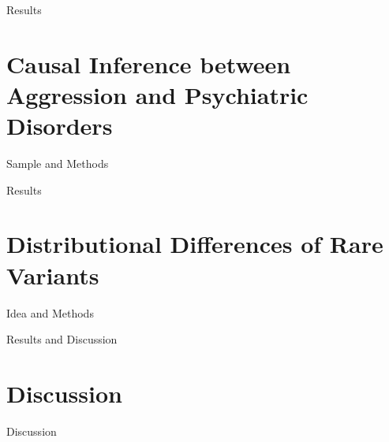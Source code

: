 \documentclass{beamer}
\begin{document}
  \begin{frame}[t]{Results}
    
  \end{frame}

  \section{Causal Inference between Aggression and Psychiatric Disorders}

  \begin{frame}[t]{Sample and Methods}
    
  \end{frame}

  \begin{frame}[t]{Results}
    
  \end{frame}

  \section{Distributional Differences of Rare Variants}

  \begin{frame}[t]{Idea and Methods}
    
  \end{frame}

  \begin{frame}[t]{Results and Discussion}
    
  \end{frame}

  \section{Discussion}

  \begin{frame}[t]{Discussion}
    
  \end{frame}
  
  
  

\end{document}

